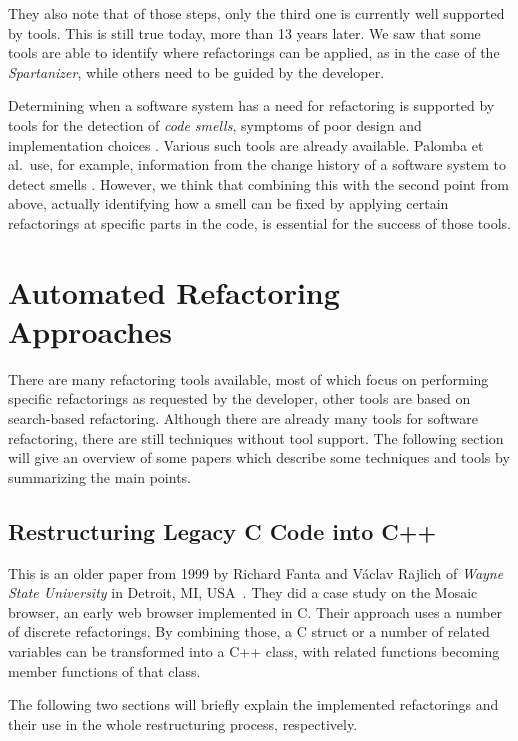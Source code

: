\documentclass[conference,compsoc,a4paper]{IEEEtran}
\newcommand{\code}[1]{{\small\ttfamily #1}}
\begin{document}
They also note that of those steps, only the third one is currently well supported by tools. This is still true today, 
more than 13 years later. We saw that some tools are able to identify where refactorings can be applied, as in the case 
of the \emph{Spartanizer}, while others need to be guided by the developer.

Determining when a software system has a need for refactoring is supported by tools for the detection of \emph{code 
smells}, symptoms of poor design and implementation choices \cite{DBLP:books/daglib/0019908}. Various such tools are 
already available. Palomba et al.\ use, for example, information from the change history of a software system to detect 
smells \cite{DBLP:conf/kbse/PalombaBPOLP13}.
However, we think that combining this with the second point from above, actually identifying how a smell can be fixed 
by applying certain refactorings at specific parts in the code, is essential for the success of those tools.


\section{Automated Refactoring Approaches} \label{sec:approaches}

There are many refactoring tools available, most of which focus on performing specific refactorings as requested by the
developer, other tools are based on search-based refactoring. Although there are already many tools for software 
refactoring, there are still techniques without tool support. The following section will give an overview of some 
papers which describe some techniques and tools by summarizing the main points.

\subsection{Restructuring Legacy C Code into C++} \label{sec:cpp}

This is an older paper from 1999 by Richard Fanta and Václav Rajlich of \emph{Wayne State University} in Detroit, MI, 
USA~\cite{cpp}. They did a case study on the Mosaic browser, an early web browser implemented in C. Their approach uses 
a number of discrete refactorings. By combining those, a C \code{struct} or a number of related variables can be 
transformed into a C++ class, with related functions becoming member functions of that class.

The following two sections will briefly explain the implemented refactorings and their use in the whole restructuring 
process, respectively.
\end{document}
